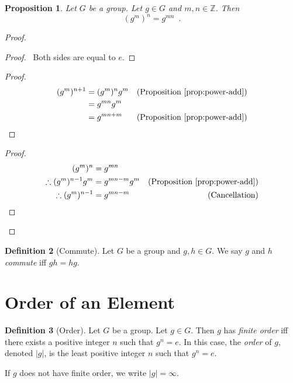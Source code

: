 \documentclass{book}
\let\qed\relax
\newtheorem{prop}{Proposition}[chapter]
\theoremstyle{definition}
\newtheorem{df}[prop]{Definition}
\begin{document}
\begin{prop}
    \label{prop:power-mult}
    Let $G$ be a group. Let $g \in G$ and $m,n \in \mathbb{Z}$. Then
    \[ (g^m)^n = g^{mn} \enspace . \]
\end{prop}

\begin{proof}
    \pf
    \begin{proof}
        \pf\ Both sides are equal to $e$.
    \end{proof}
    \begin{proof}
        \pf
        \begin{align*}
            (g^m)^{n+1} & = (g^m)^n g^m & (\text{Proposition \ref{prop:power-add}}) \\
            & = g^{mn} g^m \\
            & = g^{mn + m} & (\text{Proposition \ref{prop:power-add}})
        \end{align*}
    \end{proof}
    \begin{proof}
        \pf
        \begin{align*}
            (g^m)^n & = g^{mn} \\
            \therefore (g^m)^{n-1} g^m & = g^{mn-m} g^m & (\text{Proposition \ref{prop:power-add}})\\
            \therefore (g^m)^{n-1} & = g^{mn-m} & (\text{Cancellation})
        \end{align*}
    \end{proof}
    \qed
\end{proof}

\begin{df}[Commute]
    Let $G$ be a group and $g,h \in G$. We say $g$ and $h$ \emph{commute} iff $gh = hg$.
\end{df}

\section{Order of an Element}

\begin{df}[Order]
    Let $G$ be a group. Let $g \in G$. Then $g$ has \emph{finite order} iff there exists a positive integer $n$ such that $g^n = e$. In this case, the \emph{order} of $g$, denoted $|g|$, is the least positive integer $n$ such that $g^n = e$.

    If $g$ does not have finite order, we write $|g| = \infty$.
\end{df}
\end{document}
